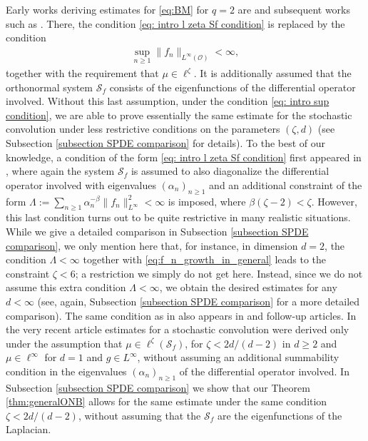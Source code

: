 \documentclass[reqno]{amsart}
\theoremstyle{plain}
\theoremstyle{remark}
\theoremstyle{plain}
\numberwithin{equation}{section}
\newcommand\cO{\mathcal{O}}
\newcommand{\1}{\one}
\newcommand{\Sf}{\mathcal{S}_{f}}
\begin{document}
 Early works deriving estimates for \eqref{eq:BM} for $q=2$
 are \cite{C03, CR04} and subsequent works such as \cite{CR05}. 
 There,
the condition \eqref{eq: intro l zeta Sf condition} is replaced by the condition
\begin{align}
\label{eq: intro sup condition}
    \sup_{n\geq 1}\|f_n\|_{L^\infty(\cO)}<\infty,
\end{align}
together with the requirement that $\mu\in\ell^\zeta$. 
It is additionally assumed that the orthonormal system $\Sf$ consists of the eigenfunctions of the differential operator involved. Without this last assumption, under the condition \eqref{eq: intro sup condition}, we 
are able to prove essentially the same estimate for the stochastic convolution under less restrictive conditions on the parameters $(\zeta,d)$
(see Subsection \ref{subsection SPDE comparison} for details). 
    To the best of our knowledge, a condition of the form \eqref{eq: intro l zeta Sf condition} first appeared in \cite{cerrai2009khasminskii}, where again the system $\Sf$ is assumed to also diagonalize the differential operator involved with eigenvalues $(\alpha_n)_{n\geq 1}$ and an additional constraint of the form $\Lambda:=\sum_{n\geq 1} \alpha_n^{-\beta}\|f_n\|_{L^\infty}^2<\infty$ is imposed, where $\beta(\zeta-2)<\zeta$. However, this last condition turns out to be quite restrictive in many realistic situations. While we give a detailed comparison in Subsection \ref{subsection SPDE comparison}, we only mention here that, for instance, in dimension $d=2$, the  condition $\Lambda<\infty$ together with \eqref{eq:f_n_growth_in_general} leads to the constraint  $\zeta<6$; a restriction we simply do not get here. 
    Instead, since we do not assume this extra condition $\Lambda<\infty$, we obtain the desired estimates for any $d<\infty$ (see, again, Subsection \ref{subsection SPDE comparison} for a more detailed comparison).
    The same condition as in \cite{cerrai2009khasminskii} also appears in  \cite{cerrai2011averaging, cerrai2017averaging} and follow-up articles.
    In the very recent article \cite{cerrai2025nonlinear} estimates for a stochastic convolution were derived only under the assumption that $\mu\in\ell^\zeta(\Sf)$, for $\zeta<2d/(d-2)$ in $d\geq 2$ and $\mu\in\ell^\infty$ for $d=1$ and $g\in L^\infty$, without assuming an additional summability condition in the eigenvalues $(\alpha_n)_{n\geq 1}$ of the differential operator involved. In Subsection \ref{subsection SPDE comparison} we show that our Theorem \ref{thm:generalONB} allows for the same estimate under the same condition $\zeta<2d/(d-2)$, without assuming that the $\Sf$ are the eigenfunctions of the Laplacian.
\end{document}
